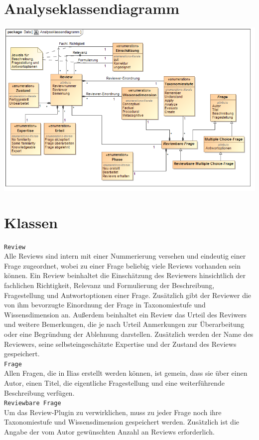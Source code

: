 \documentclass[a4paper]{scrreprt}
\begin{document}
\section{Analyseklassendiagramm}
\includegraphics[width=1.0\textwidth]{Class_Diagram__Analyseklassendiagramm.png}
\label{Analyseklassendiagramm}
 
\section{Klassen}
\texttt{Review}\\
Alle Reviews sind intern mit einer Nummerierung versehen und eindeutig einer Frage zugeordnet, wobei zu einer Frage beliebig viele Reviews vorhanden sein können. Ein Review beinhaltet die Einschätzung des Reviewers hinsichtlich der fachlichen Richtigkeit, Relevanz und Formulierung der Beschreibung, Fragestellung und Antwortoptionen einer Frage. Zusätzlich gibt der Reviewer die von ihm bevorzugte Einordnung der Frage in Taxonomiestufe und Wissensdimension an. Außerdem beinhaltet ein Review das Urteil des Reviwers und weitere Bemerkungen, die je nach Urteil Anmerkungen zur Überarbeitung oder eine Begründung der Ablehnung darstellen. Zusätzlich werden der Name des Reviewers, seine selbsteingeschätzte Expertise und der Zustand des Reviews gespeichert.\\
\texttt{Frage}\\
Allen Fragen, die in Ilias erstellt werden können, ist gemein, dass sie über einen Autor, einen Titel, die eigentliche Fragestellung und eine weiterführende Beschreibung verfügen.\\

\texttt{Reviewbare Frage}\\
Um das Review-Plugin zu verwirklichen, muss zu jeder Frage noch ihre Taxonomiestufe und Wissensdimension gespeichert werden. Zusätzlich ist die Angabe der vom Autor gewünschten Anzahl an Reviews erforderlich.\\
\end{document}
